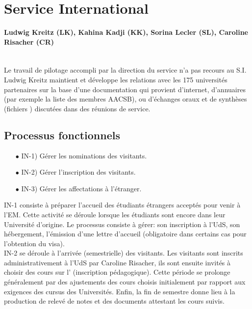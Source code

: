 \documentclass{book}
\begin{document}
\section{Service International}

\paragraph{Ludwig Kreitz (LK), Kahina Kadji (KK), Sorina Lecler (SL), Caroline Risacher (CR)}
~\\

Le travail de pilotage accompli par la direction du service n'a pas recours
au S.I. Ludwig Kreitz maintient et développe les relations avec les 175
universités partenaires sur la base d'une documentation qui provient d'internet, 
d'annuaires (par exemple la liste des membres AACSB), ou d'échanges oraux et
de synthèses (fichiers ) discutées dans des réunions de service.


\subsection{Processus fonctionnels}

\begin{itemize}
\item[$\bullet$] IN-1) Gérer les nominations des visitants.
\item[$\bullet$] IN-2) Gérer l'inscription des visitants.
\item[$\bullet$] IN-3) Gérer les affectations à l'étranger.
\end{itemize}

\bigskip
IN-1 consiste à préparer l'accueil des étudiants étrangers acceptés
pour venir à l'EM. Cette activité se déroule lorsque les étudiants
sont encore dans leur Université d'origine. Le processus consiste 
à gérer: son inscription à l'UdS, son hébergement, l'émission d'une 
lettre d'accueil (obligatoire dans certains cas pour l'obtention du 
visa).  \\

IN-2 se déroule à l'arrivée (semestrielle) des visitants. Les visitants 
sont inscrits administrativement à l'UdS par Caroline Risacher, ils sont 
ensuite invités à choisir des cours sur l' (inscription
pédagogique). Cette période se prolonge généralement par des ajustements
des cours choisis initialement par rapport aux exigences des cursus des 
Universités. Enfin, la fin de semestre donne lieu à la production de
relevé de notes et des documents attestant les cours suivis.\\
\end{document}
